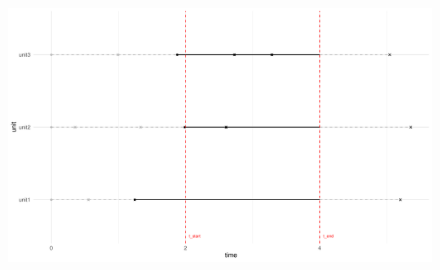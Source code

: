 \begin{figure}[h]
    \centering
    \includegraphics[width=1\textwidth]{./figures/left_truncation_w_right_censoring_example.pdf}
    \caption{}
    \label{fig:left_trunc_and_right_cens_example}
\end{figure}

